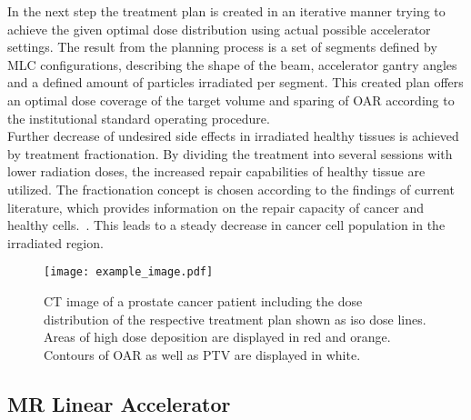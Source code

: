 In the next step the treatment plan is created in an iterative manner trying to achieve the given optimal dose distribution using actual possible accelerator settings.
The result from the planning process is a set of segments defined by \ac{MLC} configurations, describing the shape of the beam, accelerator gantry angles and a defined amount of particles irradiated per segment.
This created plan offers an optimal dose coverage of the target volume and sparing of \ac{OAR} according to the institutional standard operating procedure.\\
Further decrease of undesired side effects in irradiated healthy tissues is achieved by treatment fractionation.
By dividing the treatment into several sessions with lower radiation doses, the increased repair capabilities of healthy tissue are utilized.
The fractionation concept is chosen according to the findings of current literature, which provides information on the repair capacity of cancer and healthy cells.~\cite{withers_innovations_1988,barendsen_dose_1982}.
This leads to a steady decrease in cancer cell population in the irradiated region.

\begin{figure}
    \centering
    \texttt{[image: example\_image.pdf]}
    \caption{
        CT image of a prostate cancer patient including the dose distribution of the respective treatment plan shown as iso dose lines. Areas of high dose deposition are displayed in red and orange. Contours of OAR as well as PTV are displayed in white.
        }\label{fig:prostate_oar}
\end{figure}

\subsection{MR Linear Accelerator}


